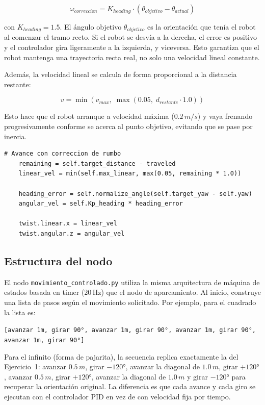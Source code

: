\begin{equation}
	\omega_{correccion} = K_{heading} \cdot (\theta_{objetivo} - \theta_{actual})
\end{equation}

con $K_{heading} = 1.5$. El ángulo objetivo $\theta_{objetivo}$ es la orientación que tenía el robot al comenzar el tramo recto. Si el robot se desvía a la derecha, el error es positivo y el controlador gira ligeramente a la izquierda, y viceversa. Esto garantiza que el robot mantenga una trayectoria recta real, no solo una velocidad lineal constante.

Además, la velocidad lineal se calcula de forma proporcional a la distancia restante:

\begin{equation}
	v = \min\left(v_{max},\; \max\left(0.05,\; d_{restante} \cdot 1.0\right)\right)
\end{equation}

Esto hace que el robot arranque a velocidad máxima ($0.2\,m/s$) y vaya frenando progresivamente conforme se acerca al punto objetivo, evitando que se pase por inercia.

\begin{lstlisting}[style=python]
	# Avance con correccion de rumbo
	remaining = self.target_distance - traveled
	linear_vel = min(self.max_linear, max(0.05, remaining * 1.0))
	
	heading_error = self.normalize_angle(self.target_yaw - self.yaw)
	angular_vel = self.Kp_heading * heading_error
	
	twist.linear.x = linear_vel
	twist.angular.z = angular_vel
\end{lstlisting}

\subsection*{Estructura del nodo}

El nodo \texttt{movimiento\_controlado.py} utiliza la misma arquitectura de máquina de estados basada en timer (20\,Hz) que el nodo de aparcamiento. Al inicio, construye una lista de pasos según el movimiento solicitado. Por ejemplo, para el cuadrado la lista es:

\begin{center}
	\texttt{[avanzar 1m, girar 90°, avanzar 1m, girar 90°, avanzar 1m, girar 90°, avanzar 1m, girar 90°]}
\end{center}

Para el infinito (forma de pajarita), la secuencia replica exactamente la del Ejercicio~1: avanzar $0.5\,m$, girar $-120°$, avanzar la diagonal de $1.0\,m$, girar $+120°$, avanzar $0.5\,m$, girar $+120°$, avanzar la diagonal de $1.0\,m$ y girar $-120°$ para recuperar la orientación original. La diferencia es que cada avance y cada giro se ejecutan con el controlador PID en vez de con velocidad fija por tiempo.

